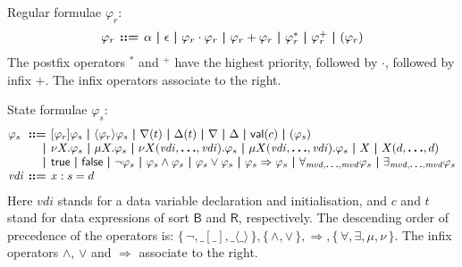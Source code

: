 \documentclass[a4paper,fleqn,10pt]{article}
\makeatletter
\newcommand{\f}[1]{\ensuremath{\mathit{#1}}}
\newcommand{\sbool}{\ensuremath{\mathsf{B}}}
\newcommand{\sreal}{\ensuremath{\mathsf{R}}}
\newenvironment{tightarray}[1]
  {\setlength{\arraycolsep}{2pt}%
   \begin{array}{@{}#1@{}}%
  }
  {\end{array}%
  }
\newcommand{\set}[1]{\ensuremath{\{\,#1\,\}}}
\newcommand{\limp}{\ensuremath{\Rightarrow}}
\newcommand{\mb}[1]{\text{\boldmath$#1$}}
\makeatother
\begin{document}
Regular formulae $\varphi_r$:
\[\begin{tightarray}{lrl}
\varphi_r & \mb{::=} & \alpha\ \mb{|}\ 
                       \epsilon\ \mb{|}\ 
                       \varphi_r \cdot \varphi_r\ \mb{|}\ 
                       \varphi_r + \varphi_r\ \mb{|}\ 
                       \varphi_r^{*} \ \mb{|}\ 
                       \varphi_r^{+} \ \mb{|}\ 
                       ( \varphi_r )
\end{tightarray}\]
The postfix operators ${}^{*}$ and ${}^{+}$ have the highest priority, followed
by $\cdot$, followed by infix $+$. The infix operators associate to the right.

State formulae $\varphi_s$:
\[\begin{tightarray}{lrl}
\varphi_s & \mb{::=} & [\varphi_r]\varphi_s\ \mb{|}\ 
                       \langle\varphi_r\rangle\varphi_s\ \mb{|}\ 
                       \nabla(t)\ \mb{|}\ 
                       \Delta(t)\ \mb{|}\ 
                       \nabla\ \mb{|}\ 
                       \Delta\ \mb{|}\ 
                       \mathsf{val}(c)\ \mb{|}\ 
                       ( \varphi_s )\\
          & \mb{|}   & \nu X. \varphi_s\ \mb{|}\ 
                       \mu X.\varphi_s\ \mb{|}\ 
                       \nu X(\f{vdi},\mb{\ldots},\f{vdi}). \varphi_s\ \mb{|}\ 
                       \mu X(\f{vdi},\mb{\ldots},\f{vdi}).\varphi_s\ \mb{|}\ 
                       X\ \mb{|}\ 
                       X(d,\mb{\ldots},d)\\
          & \mb{|}   & \mathsf{true}\ \mb{|}\ 
                       \mathsf{false}\ \mb{|}\ 
                       \neg \varphi_s\ \mb{|}\ 
                       \varphi_s \land \varphi_s\ \mb{|}\ 
                       \varphi_s \lor  \varphi_s\ \mb{|}\ 
                       \varphi_s \limp \varphi_s\ \mb{|}\ 
                       \forall_{\f{mvd},\mb{\ldots},\f{mvd}} \varphi_s\ \mb{|}\ 
                       \exists_{\f{mvd},\mb{\ldots},\f{mvd}} \varphi_s\\
\f{vdi}  & \mb{::=} & x: s = d\\
\end{tightarray}\]
Here $\f{vdi}$ stands for a data variable declaration and initialisation,
and $c$ and $t$ stand for data expressions of
sort $\sbool$ and $\sreal$, respectively.  The descending order of precedence
of the operators is: $\set{\neg, \_[\_], \_\langle\_\rangle},
\set{\land,\lor}, \limp, \set{\forall, \exists, \mu, \nu}$.  The infix
operators $\land$, $\lor$ and $\limp$ associate to the right.
\end{document}
